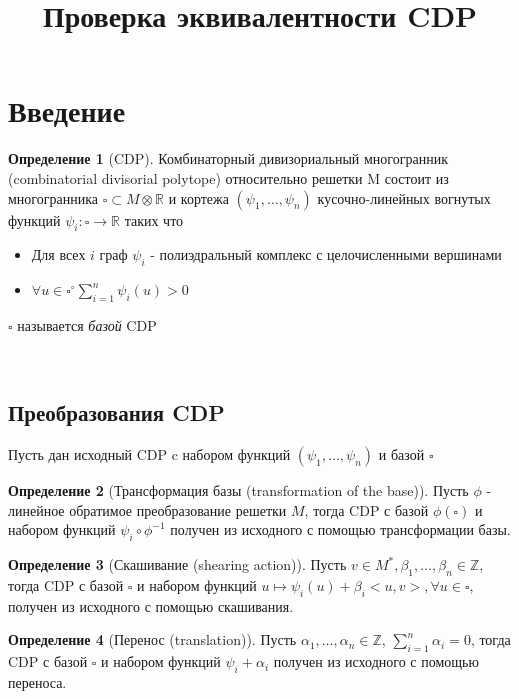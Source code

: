 \documentclass[16pt]{article}
\title{Проверка эквивалентности CDP}
\theoremstyle{definition}
\newtheorem{definition}{Определение}[section]
\begin{document}
\maketitle

\section{Введение}

\begin{definition}[CDP] 
Комбинаторный дивизориальный многогранник (combinatorial divisorial polytope) относительно решетки M состоит из многогранника $\square \subset M \otimes \mathds{R}$ и кортежа $(\psi_1, \dots, \psi_n)$ кусочно-линейных вогнутых функций $\psi_i: \square \rightarrow \mathds{R}$ таких что
\begin{itemize}
	\item[1] Для всех $i$ граф $\psi_i$ - полиэдральный комплекс с целочисленными вершинами
	\item[2] $\forall u \in \square^{\circ} \sum_{i=1}^n\psi_i(u) > 0$
\end{itemize}
$\square$ называется \emph{базой} CDP
\end{definition}

\\

\subsection{Преобразования CDP}
Пусть дан исходный CDP c набором функций $(\psi_1, \dots, \psi_n)$ и базой $\square$

\begin{definition}[Трансформация базы (transformation of the base)]
Пусть $\phi$ - линейное обратимое преобразование решетки $M$, тогда CDP с базой $\phi(\square)$ и набором функций 
$\psi_i \circ \phi^{-1}$ получен из исходного с помощью  трансформации базы.
\end{definition}

\begin{definition}[Скашивание (shearing action)]
Пусть $v \in M^*, \beta_1, \dots, \beta_n \in \mathds{Z}$, тогда CDP с базой $\square$ и набором функций $u \mapsto
 \psi_i(u) + \beta_i<u, v>, \forall u \in \square$, получен из исходного с помощью скашивания.
\end{definition}

\begin{definition}[Перенос (translation)]
Пусть $\alpha_1, \dots, \alpha_n \in \mathds{Z}
$, $\sum_{i=1}^n \alpha_i = 0$, тогда CDP с базой $\square$ и набором функций $\psi_i + \alpha_i$ получен из исходного с помощью переноса.
\end{definition}
\end{document}
